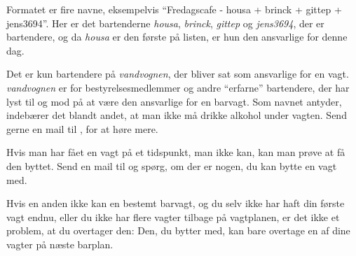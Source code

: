 Formatet er fire navne, eksempelvis ``Fredagscafe - housa + brinck +
gittep + jens3694''. Her er det bartenderne \emph{housa},
\emph{brinck}, \emph{gittep} og \emph{jens3694}, der er bartendere, og
da \emph{housa} er den første på listen, er hun den ansvarlige for
denne dag.

Det er kun bartendere på \emph{vandvognen}, der bliver sat som
ansvarlige for en vagt. \emph{vandvognen} er for bestyrelsesmedlemmer
og andre ``erfarne'' bartendere, der har lyst til og mod på at være
den ansvarlige for en barvagt. Som navnet antyder, indebærer det
blandt andet, at man ikke må drikke alkohol under vagten. Send gerne
en mail til , for at høre mere.

Hvis man har fået en vagt på et tidspunkt, man ikke kan, kan man prøve
at få den byttet. Send en mail til  og
spørg, om der er nogen, du kan bytte en vagt med.

Hvis en anden ikke kan en bestemt barvagt, og du selv ikke har haft
din første vagt endnu, eller du ikke har flere vagter tilbage på
vagtplanen, er det ikke et problem, at du overtager den: Den, du
bytter med, kan bare overtage en af dine vagter på næste barplan.



